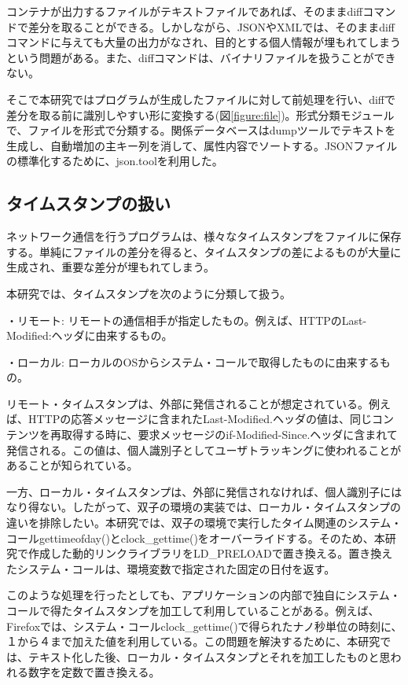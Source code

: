 \documentclass[a4paper,twocolumn,10pt]{jarticle}
\begin{document}
コンテナが出力するファイルがテキストファイルであれば、そのままdiffコマンドで差分を取ることができる。しかしながら、JSONやXMLでは、そのままdiffコマンドに与えても大量の出力がなされ、目的とする個人情報が埋もれてしまうという問題がある。また、diffコマンドは、バイナリファイルを扱うことができない。

そこで本研究ではプログラムが生成したファイルに対して前処理を行い、diffで差分を取る前に識別しやすい形に変換する(図\ref{figure:file})。形式分類モジュールで、ファイルを形式で分類する。関係データベースはdumpツールでテキストを生成し、自動増加の主キー列を消して、属性内容でソートする。JSONファイルの標準化するために、json.toolを利用した。


\subsection{タイムスタンプの扱い}
\label{cha:timestamp}
ネットワーク通信を行うプログラムは、様々なタイムスタンプをファイルに保存する。単純にファイルの差分を得ると、タイムスタンプの差によるものが大量に生成され、重要な差分が埋もれてしまう。

本研究では、タイムスタンプを次のように分類して扱う。


\begin{description}
\item{・リモート: }
リモートの通信相手が指定したもの。例えば、HTTPのLast-Modified:ヘッダに由来するもの。
\item{・ローカル: }
ローカルのOSからシステム・コールで取得したものに由来するもの。
\end{description}


リモート・タイムスタンプは、外部に発信されることが想定されている。例えば、HTTPの応答メッセージに含まれたLast-Modified.ヘッダの値は、同じコンテンツを再取得する時に、要求メッセージのif-Modified-Since.ヘッダに含まれて発信される。この値は、個人識別子としてユーザトラッキングに使われることがあることが知られている。

一方、ローカル・タイムスタンプは、外部に発信されなければ、個人識別子にはなり得ない。したがって、双子の環境の実装では、ローカル・タイムスタンプの違いを排除したい。本研究では、双子の環境で実行したタイム関連のシステム・コールgettimeofday()とclock\_gettime()をオーバーライドする。そのため、本研究で作成した動的リンクライブラリをLD\_PRELOADで置き換える。置き換えたシステム・コールは、環境変数で指定された固定の日付を返す。


このような処理を行ったとしても、アプリケーションの内部で独自にシステム・コールで得たタイムスタンプを加工して利用していることがある。例えば、Firefoxでは、システム・コールclock\_gettime()で得られたナノ秒単位の時刻に、１から４まで加えた値を利用している。この問題を解決するために、本研究では、テキスト化した後、ローカル・タイムスタンプとそれを加工したものと思われる数字を定数で置き換える。
\end{document}
